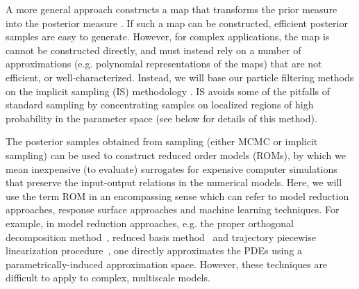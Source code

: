 \documentclass[11pt]{article}
\newcommand{\MarginPar}[1]{\marginpar{%
\vskip-\baselineskip %
\raggedright\tiny\sffamily
\hrule\smallskip{\color{red}#1}\par\smallskip\hrule}}
\begin{document}
A more general approach constructs a map that transforms the prior
measure into the posterior measure \cite{Moselhy2013}.  If such a map
can be constructed, efficient posterior samples are easy to generate.
However, for complex applications, the map is cannot be constructed
directly, and must instead rely on a number of approximations
(e.g. polynomial representations of the maps) that are not efficient,
or well-characterized.  Instead, we will base our particle filtering
methods on the implicit sampling (IS) methodology
\cite{chorintupnas,chorin2010,Morzfeld2011,Morzfeld2012,Atkins2013}.
IS avoids some of the pitfalls of standard sampling by
concentrating samples on localized regions of high probability in 
the parameter space (see below for details of this method).
\MarginPar{MSD: Rewrote to shorten}

The posterior samples obtained from sampling (either MCMC or implicit sampling) can be used to construct reduced order models (ROMs), by which we mean inexpensive (to evaluate) surrogates for expensive computer simulations that preserve the input-output relations in the numerical models.
Here, we will use the term ROM in an encompassing sense which can refer to model reduction approaches, response surface approaches and machine learning techniques. For example, in model reduction approaches, e.g. the proper orthogonal decomposition method~\cite{Cardoso:2009jn, Lieberman:2010dw, Willcox:2002uk}, reduced basis method~\cite{Prudhomme:2002ug,Quarteroni:2011jm} and trajectory piecewise linearization procedure~\cite{Cardoso:2010, Rewienski:2003tr}, one directly approximates the PDEs using a parametrically-induced approximation space.
However, these techniques are difficult to apply to complex, multiscale models.
\end{document}
